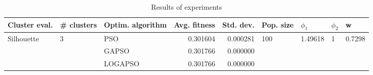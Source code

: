 \begin{table}
\centering
\caption{Results of experiments}
\begin{tabular}{lllrrllll}
\toprule
              Cluster eval. &        \# clusters & Optim. algorithm &  Avg. fitness &  Std. dev. &            Pop. size &               $\phi_{1}$ &         $\phi_{2}$ &                       w \\
\midrule
\multirow{3}{*}{Silhouette} & \multirow{3}{*}{3} &              PSO &      0.301604 &   0.000281 & \multirow{3}{*}{100} & \multirow{3}{*}{1.49618} & \multirow{3}{*}{1} & \multirow{3}{*}{0.7298} \\
                            &                    &            GAPSO &      0.301766 &   0.000000 &                      &                          &                    &                         \\
                            &                    &          LOGAPSO &      0.301766 &   0.000000 &                      &                          &                    &                         \\
\bottomrule
\end{tabular}
\end{table}
